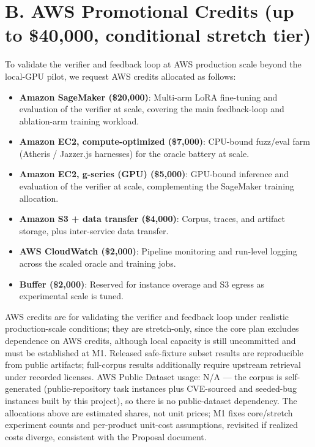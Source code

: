 \documentclass[11pt]{article}
\begin{document}
\section*{B. AWS Promotional Credits (up to \$40,000, conditional stretch tier)}
To validate the verifier and feedback loop at AWS production scale beyond the local-GPU pilot, we request AWS credits allocated as follows:
\begin{itemize}[leftmargin=1.3em, itemsep=0.5ex, topsep=2pt]
\item \textbf{Amazon SageMaker (\$20,000)}: Multi-arm LoRA fine-tuning and evaluation of the verifier at scale, covering the main feedback-loop and ablation-arm training workload.
\item \textbf{Amazon EC2, compute-optimized (\$7,000)}: CPU-bound fuzz/eval farm (Atheris / Jazzer.js harnesses) for the oracle battery at scale.
\item \textbf{Amazon EC2, g-series (GPU) (\$5,000)}: GPU-bound inference and evaluation of the verifier at scale, complementing the SageMaker training allocation.
\item \textbf{Amazon S3 + data transfer (\$4,000)}: Corpus, traces, and artifact storage, plus inter-service data transfer.
\item \textbf{AWS CloudWatch (\$2,000)}: Pipeline monitoring and run-level logging across the scaled oracle and training jobs.
\item \textbf{Buffer (\$2,000)}: Reserved for instance overage and S3 egress as experimental scale is tuned.
\end{itemize}

AWS credits are for validating the verifier and feedback loop under realistic production-scale conditions; they are stretch-only, since the core plan excludes dependence on AWS credits, although local capacity is still uncommitted and must be established at M1. Released safe-fixture subset results are reproducible from public artifacts; full-corpus results additionally require upstream retrieval under recorded licenses. AWS Public Dataset usage: N/A --- the corpus is self-generated (public-repository task instances plus CVE-sourced and seeded-bug instances built by this project), so there is no public-dataset dependency. The allocations above are estimated shares, not unit prices; M1 fixes core/stretch experiment counts and per-product unit-cost assumptions, revisited if realized costs diverge, consistent with the Proposal document.
\end{document}
